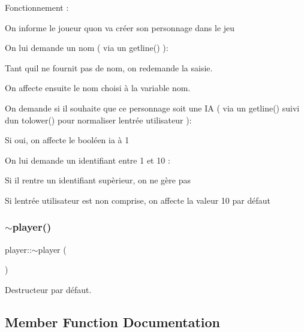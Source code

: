 Fonctionnement \+:
\begin{DoxyEnumerate}
\item On informe le joueur qu\textquotesingle{}on va créer son personnage dans le jeu
\item On lui demande un nom ( via un getline() )\+:
\begin{DoxyItemize}
\item Tant qu\textquotesingle{}il ne fournit pas de nom, on redemande la saisie.
\item On affecte ensuite le nom choisi à la variable nom.
\end{DoxyItemize}
\item On demande si il souhaite que ce personnage soit une IA ( via un getline() suivi d\textquotesingle{}un tolower() pour normaliser l\textquotesingle{}entrée utilisateur )\+:
\begin{DoxyItemize}
\item Si oui, on affecte le booléen ia à 1
\end{DoxyItemize}
\item On lui demande un identifiant entre 1 et 10 \+:
\begin{DoxyItemize}
\item Si il rentre un identifiant supèrieur, on ne gère pas
\item Si l\textquotesingle{}entrée utilisateur est non comprise, on affecte la valeur 10 par défaut 
\end{DoxyItemize}
\end{DoxyEnumerate}\mbox{\label{classplayer_aab5d2e47b80e0481f09ca0df8b823057}} 
\subsubsection{\texorpdfstring{$\sim$player()}{~player()}}
{\footnotesize\ttfamily player\+::$\sim$player (\begin{DoxyParamCaption}{ }\end{DoxyParamCaption})}



Destructeur par défaut. 



\subsection{Member Function Documentation}
\mbox{\label{classplayer_a2590189e7416dc8a5cf2686a606f138b}} 
